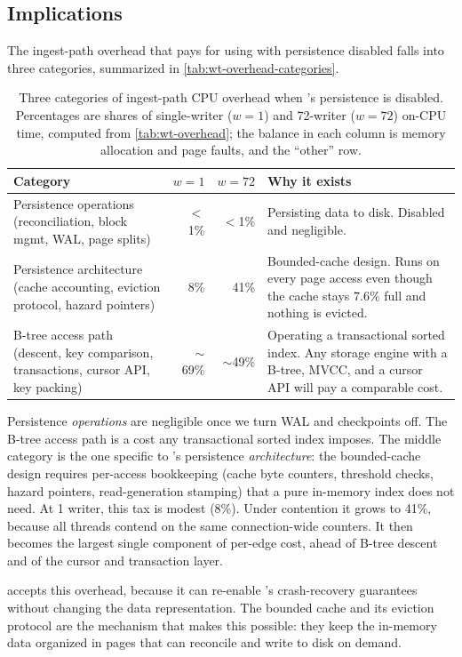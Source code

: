 \subsection{Implications}
\label{sec:wt-overhead-implications}

The ingest-path overhead that \project{} pays for using \wt{} with persistence disabled
falls into three categories, summarized in \autoref{tab:wt-overhead-categories}.

\begin{table}[h]
  \centering
  \begin{tabularx}{\columnwidth}{@{}XrrX@{}}
    \toprule
    Category & $w=1$ & $w=72$ & Why it exists \\
    \midrule
    Persistence operations (reconciliation, block mgmt, WAL, page splits)
      & $<$1\% & $<$1\% & Persisting data to disk. Disabled and negligible. \\
    \addlinespace
    Persistence architecture (cache accounting, eviction protocol, hazard pointers)
      & 8\% & 41\% & Bounded-cache design. Runs on every page access even though the cache
        stays $7.6\%$ full and nothing is evicted. \\
    \addlinespace
    B-tree access path (descent, key comparison, transactions, cursor API, key packing)
      & $\sim$69\% & $\sim$49\% & Operating a transactional sorted index. Any storage
        engine with a B-tree, MVCC, and a cursor API will pay a comparable cost. \\
    \bottomrule
  \end{tabularx}
  \caption{Three categories of ingest-path CPU overhead when \wt{}'s persistence is
  disabled.
  Percentages are shares of single-writer ($w=1$) and 72-writer ($w=72$) on-CPU time, computed
  from \autoref{tab:wt-overhead}; the balance in each column is memory allocation and page
  faults, and the ``other'' row.}
  \label{tab:wt-overhead-categories}
\end{table}

Persistence \emph{operations} are negligible once we turn WAL and checkpoints off.
The B-tree access path is a cost any transactional sorted index imposes.
The middle category is the one specific to \wt{}'s persistence \emph{architecture}: the
bounded-cache design requires per-access bookkeeping (cache byte counters, threshold
checks, hazard pointers, read-generation stamping) that a pure in-memory index does not need.
At 1 writer, this tax is modest (8\%).
Under contention it grows to 41\%, because all threads contend on the same connection-wide
counters.
It then becomes the largest single component of per-edge cost, ahead of B-tree descent and
of the cursor and transaction layer.

\project{} accepts this overhead, because it can re-enable \wt{}'s crash-recovery
guarantees without changing the data representation.
The bounded cache and its eviction protocol are the mechanism that makes this possible:
they keep the in-memory data organized in pages that \wt{} can reconcile and write to
disk on demand.
